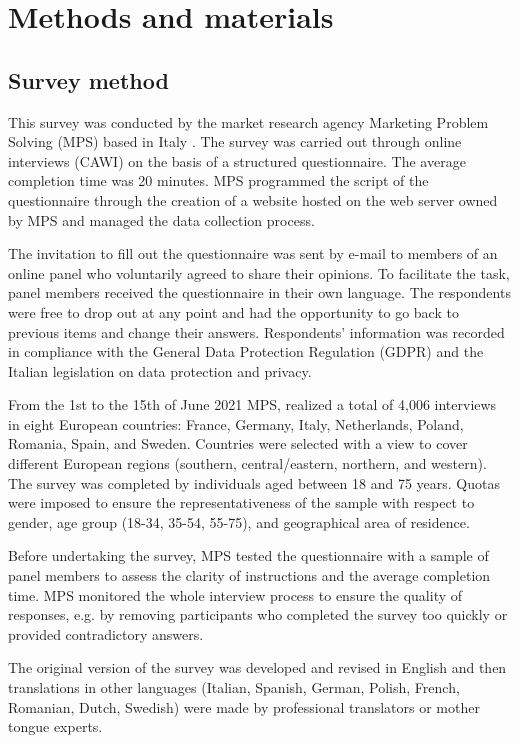 \documentclass{article}
\begin{document}
\section{Methods and materials}

\subsection{Survey method}

This survey was conducted by the market research agency Marketing Problem Solving (MPS) based in Italy \cite{Mpswebsite}. The survey was carried out through online interviews (CAWI) on the basis of a structured questionnaire. The average completion time was 20 minutes. MPS programmed the script of the questionnaire through the creation of a website hosted on the web server owned by MPS and managed the data collection process. 

The invitation to fill out the questionnaire was sent by e-mail to members of an online panel who voluntarily agreed to share their opinions. To facilitate the task, panel members received the questionnaire in their own language. The respondents were free to drop out at any point and had the opportunity to go back to previous items and change their answers. Respondents' information was recorded in compliance with the General Data Protection Regulation (GDPR) and the Italian legislation on data protection and privacy. 

From the 1st to the 15th of June 2021 MPS, realized a total of 4,006 interviews in eight European countries: France, Germany, Italy, Netherlands, Poland, Romania, Spain, and Sweden. Countries were selected with a view to cover different European regions (southern, central/eastern, northern, and western). The survey was completed by individuals aged between 18 and 75 years. Quotas were imposed to ensure the representativeness of the sample with respect to gender, age group (18-34, 35-54, 55-75), and geographical area of residence.

Before undertaking the survey, MPS tested the questionnaire with a sample of panel members to assess the clarity of instructions and the average completion time. MPS monitored the whole interview process to ensure the quality of responses, e.g. by removing participants who completed the survey too quickly or provided contradictory answers.

The original version of the survey was developed and revised in English and then translations in other languages (Italian, Spanish, German, Polish, French, Romanian, Dutch, Swedish) were made by professional translators or mother tongue experts.
\end{document}
